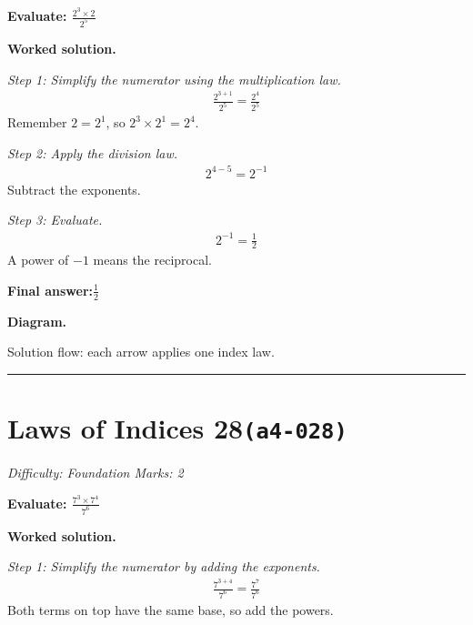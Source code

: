 \documentclass[11pt]{article}
\newcommand{\question}[1]{\par\medskip\noindent\textbf{#1}\par}
\begin{document}
\question{Evaluate: \( \frac{2^3 \times 2}{2^5} \)}

\textbf{Worked solution.}

\textit{Step 1: Simplify the numerator using the multiplication law.}
\[\begin{gathered}
\frac{2^{3+1}}{2^5} = \frac{2^4}{2^5}
\end{gathered}\]
Remember \( 2 = 2^1 \), so \( 2^3 \times 2^1 = 2^4 \).

\textit{Step 2: Apply the division law.}
\[\begin{gathered}
2^{4-5} = 2^{-1}
\end{gathered}\]
Subtract the exponents.

\textit{Step 3: Evaluate.}
\[\begin{gathered}
2^{-1} = \frac{1}{2}
\end{gathered}\]
A power of \( -1 \) means the reciprocal.

\begin{answerbox}
\textbf{Final answer:}\quad \(\displaystyle \frac{1}{2}\)
\end{answerbox}
\textbf{Diagram.}

\begin{center}
\end{center}
\small Solution flow: each arrow applies one index law.\normalsize

\medskip\hrule

\section*{Laws of Indices 28\quad\small\texttt{(a4-028)}}
\textit{Difficulty: Foundation \quad\textbar\quad Marks: 2}

\question{Evaluate: \( \frac{7^3 \times 7^4}{7^6} \)}

\textbf{Worked solution.}

\textit{Step 1: Simplify the numerator by adding the exponents.}
\[\begin{gathered}
\frac{7^{3+4}}{7^6} = \frac{7^7}{7^6}
\end{gathered}\]
Both terms on top have the same base, so add the powers.
\end{document}
